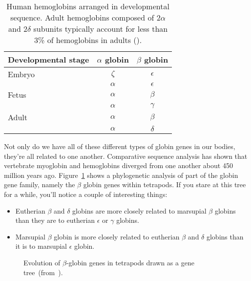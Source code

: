 \begin{table}
\begin{center}
\begin{tabular}{l|cc}
\hline\hline
Developmental stage & $\alpha$ globin & $\beta$ globin \\
\hline
Embryo & $\zeta$  & $\epsilon$ \\
       & $\alpha$ & $\epsilon$ \\
Fetus  & $\alpha$ & $\beta$ \\
       & $\alpha$  & $\gamma$ \\
Adult  & $\alpha$ & $\beta$ \\
       & $\alpha$ & $\delta$ \\
\hline
\end{tabular}
\end{center}
\caption{Human hemoglobins arranged in developmental sequence. Adult
  hemoglobins composed of 2$\alpha$ and 2$\delta$ subunits typically
  account for less than 3\% of hemoglobins in adults ().}\label{table:globins}
\end{table}

Not only do we have all of these different types of globin genes in
our bodies, they're all related to one another. Comparative sequence
analysis has shown that vertebrate myoglobin and hemoglobins diverged
from one another about 450 million years ago. Figure~\ref{fig:globins}
shows a phylogenetic analysis of part of the globin gene family,
namely the $\beta$ globin genes within tetrapods. If you stare at this
tree for a while, you'll notice a couple of interesting things:

\begin{itemize}

\item Eutherian $\beta$ and $\delta$ globins are more closely related
  to marsupial $\beta$ globins than they are to eutherian $\epsilon$
  or $\gamma$ globins.

\item Marsupial $\beta$ globin is more closely related to eutherian
  $\beta$ and $\delta$ globins than it is to marsupial $\epsilon$
  globin. 

\end{itemize}

\begin{figure}
\begin{center}
\end{center}
\caption{Evolution of $\beta$-globin genes in tetrapods drawn as a
  gene tree~(from~\cite{Opazo-etal-2008}).}\label{fig:globins}
\end{figure}

